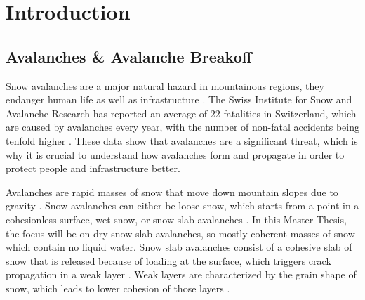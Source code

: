 \chapter{Introduction}
\label{chap:introduction}
%
%



\section{Avalanches \& Avalanche Breakoff}
Snow avalanches are a major natural hazard in mountainous regions, they endanger human life as well as infrastructure \parencite{schweizerSnowAvalancheFormation2003}. The Swiss Institute for Snow and Avalanche Research has reported an average of 22 fatalities in Switzerland, which are caused by avalanches every year, with the number of non-fatal accidents being tenfold higher \parencite{LongtermStatistics}. These data show that avalanches are a significant threat, which is why it is crucial to understand how avalanches form and propagate in order to protect people and infrastructure better.

  Avalanches are rapid masses of snow that move down mountain slopes due to gravity \parencite{anceySnowAvalanches2001}. Snow avalanches can either be loose snow, which starts from a point in a cohesionless surface, wet snow, or snow slab avalanches \parencite{schweizerSnowAvalancheFormation2003}. In this Master Thesis, the focus will be on dry snow slab avalanches, so mostly coherent masses of snow which contain no liquid water. Snow slab avalanches consist of a cohesive slab of snow \parencite{schweizerSnowAvalancheFormation2003} that is released because of loading at the surface, which triggers crack propagation in a weak layer \parencite{gaumeSnowFractureRelation2017a}. Weak layers are characterized by the grain shape of snow, which leads to lower cohesion of those layers \parencite{fohnMechanicalStructuralProperties1998}. 

